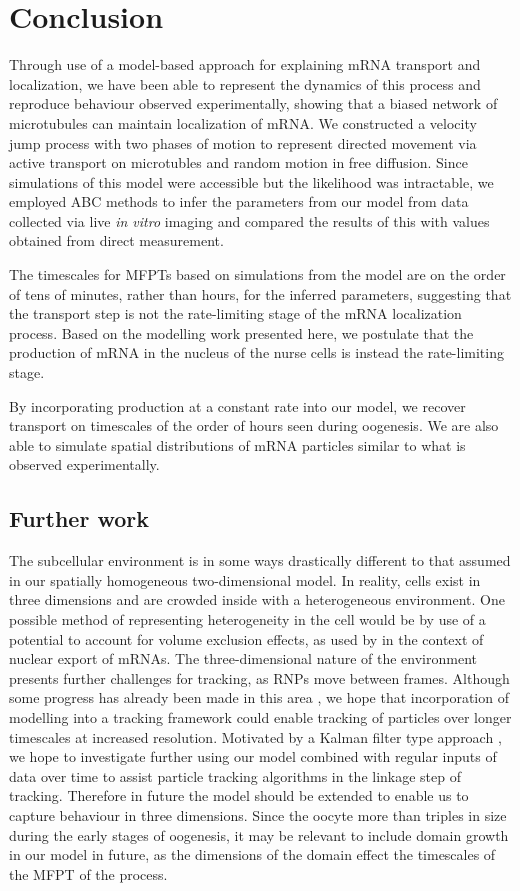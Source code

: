 \documentclass[twocolumn]{biophys}
\begin{document}
\section{Conclusion} \label{Conclusions}
Through use of a model-based approach for explaining mRNA transport and localization, we have been able to represent the dynamics of this process and reproduce behaviour observed experimentally, showing that a biased network of microtubules can maintain localization of mRNA.
We constructed a velocity jump process with two phases of motion to represent directed movement via active transport on microtubles and random motion in free diffusion.
Since simulations of this model were accessible but the likelihood was intractable, we employed ABC methods to infer the parameters from our model from data collected via live \textit{in vitro} imaging and compared the results of this with values obtained from direct measurement.

The timescales for MFPTs based on simulations from the model are on the order of tens of minutes, rather than hours, for the inferred parameters, suggesting that the transport step is not the rate-limiting stage of the mRNA localization process.
Based on the modelling work presented here, we postulate that the production of mRNA in the nucleus of the nurse cells is instead the rate-limiting stage.

By incorporating production at a constant rate into our model, we recover transport on timescales of the order of hours seen during oogenesis.
We are also able to simulate spatial distributions of mRNA particles similar to what is observed experimentally.  

\subsection{Further work}
The subcellular environment is in some ways drastically different to that assumed in our spatially homogeneous two-dimensional model.
In reality, cells exist in three dimensions and are crowded inside with a heterogeneous environment. 
One possible method of representing heterogeneity in the cell would be by use of a potential to account for volume exclusion effects, as used by \citet{isaacson2011influence} in the context of nuclear export of mRNAs.
The three-dimensional nature of the environment presents further challenges for tracking, as RNPs move between frames.
Although some progress has already been made in this area \citep{thompson2010three}, we hope that incorporation of modelling into a tracking framework could enable tracking of particles over longer timescales at increased resolution. 
Motivated by a Kalman filter type approach \citep{faragher2012understanding}, we hope to investigate further using our model combined with regular inputs of data over time to assist particle tracking algorithms in the linkage step of tracking.
Therefore in future the model should be extended to enable us to capture behaviour in three dimensions. 
Since the oocyte more than triples in size during the early stages of oogenesis, it may be relevant to include domain growth in our model in future, as the dimensions of the domain effect the timescales of the MFPT of the process.
\end{document}
